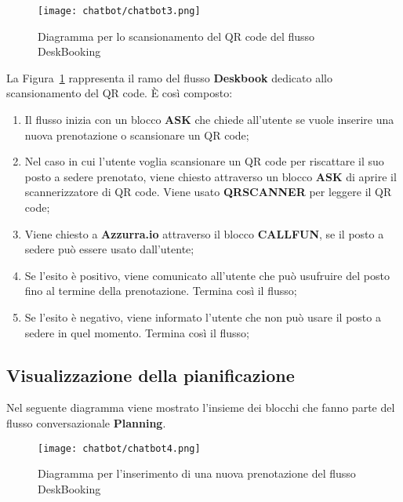 \begin{figure}[h]
	\centering
	\texttt{[image: chatbot/chatbot3.png]}
	\caption{Diagramma per lo scansionamento del QR code del flusso DeskBooking}\label{fig:qrcode}
\end{figure}

La Figura~\ref{fig:qrcode} rappresenta il ramo del flusso \textbf{Deskbook} dedicato allo scansionamento del QR code. È così composto:

\begin{enumerate}
	\item Il flusso inizia con un blocco \textbf{ASK} che chiede all'utente se vuole inserire una nuova prenotazione o scansionare un QR code;
	\item Nel caso in cui l'utente voglia scansionare un QR code per riscattare il suo posto a sedere prenotato, viene chiesto attraverso un blocco \textbf{ASK} di aprire il scannerizzatore di QR code. Viene usato \textbf{QRSCANNER} per leggere il QR code;
	\item Viene chiesto a \textbf{Azzurra.io} attraverso il blocco \textbf{CALLFUN}, se il posto a sedere può essere usato dall'utente;
	\item Se l'esito è positivo, viene comunicato all'utente che può usufruire del posto fino al termine della prenotazione. Termina così il flusso;
	\item Se l'esito è negativo, viene informato l'utente che non può usare il posto a sedere in quel momento. Termina così il flusso;
\end{enumerate}

\subsection{Visualizzazione della pianificazione}
Nel seguente diagramma viene mostrato l'insieme dei blocchi che fanno parte del flusso conversazionale \textbf{Planning}.

\begin{figure}[h]
	\centering
	\texttt{[image: chatbot/chatbot4.png]}
	\caption{Diagramma per l'inserimento di una nuova prenotazione del flusso DeskBooking}\label{fig:plan}
\end{figure}

